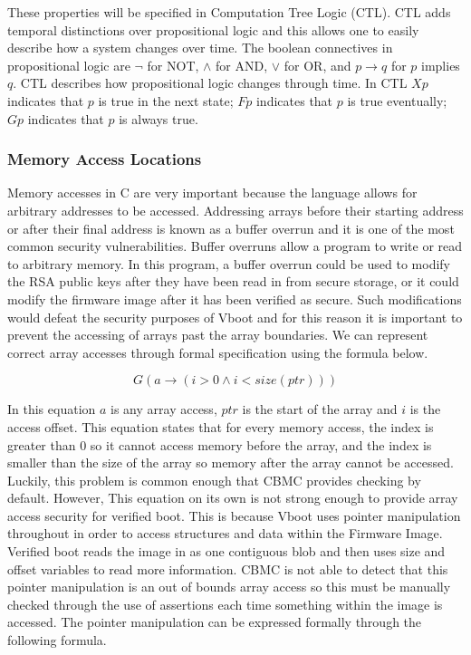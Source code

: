 \documentclass[../report.tex]{subfiles}
\begin{document}
These properties will be specified in Computation Tree Logic (CTL). 
CTL adds temporal distinctions over propositional logic and this allows one to easily describe how a system changes over time.
The boolean connectives in propositional logic are $\lnot$ for NOT, $\land$ for
AND, $\lor$ for OR, and $p \to q$ for $p$ implies $q$.
CTL describes how propositional logic changes through time.
In CTL $Xp$ indicates that $p$ is true in the next state; $Fp$ indicates that $p$ is true eventually; $Gp$ indicates that $p$ is always true.

\subsubsection{Memory Access Locations}

Memory accesses in C are very important because the language allows for arbitrary addresses to be accessed. 
Addressing arrays before their starting address or after their final address is known as a buffer overrun and it is one of the most common security vulnerabilities. 
Buffer overruns allow a program to write or read to arbitrary memory. 
In this program, a buffer overrun could be used to modify the RSA public keys after they have been read in from secure storage, or it could modify the firmware image after it has been verified as secure. 
Such modifications would defeat the security purposes of Vboot and for this reason it is important to prevent the accessing of arrays past the array boundaries.
We can represent correct array accesses through formal specification using the formula below.

\begin{equation}
    G(a \to (i > 0 \land i < size(ptr)))
\end{equation}

In this equation $a$ is any array access, $ptr$ is the start of the array and $i$ is the access offset.
This equation states that for every memory access, the index is greater than 0 so it cannot access memory before the array,  and the index is smaller than the size of the array so memory after the array cannot be accessed.
Luckily, this problem is common enough that CBMC provides checking by default.
However, This equation on its own is not strong enough to provide array access security for verified boot. 
This is because Vboot uses pointer manipulation throughout in order to access structures and data within the Firmware Image. 
Verified boot reads the image in as one contiguous blob and then uses size and offset variables to read more information.
CBMC is not able to detect that this pointer manipulation is an out of bounds array access so this must be manually checked through the use of assertions each time something within the image is accessed.
The pointer manipulation can be expressed formally through the following formula.
\end{document}
